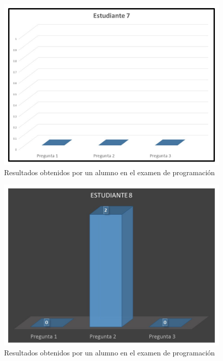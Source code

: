 \documentclass[12pt] {report}
\begin{document}
\begin{figure}[H]
\centering 
\includegraphics[scale=.4]{PEstudiante7.JPG}
\caption{Resultados obtenidos por un alumno en el examen de programación}
\end{figure}

\begin{figure}[H]
\centering 
\includegraphics[scale=.4]{PEstudiante8.JPG}
\caption{Resultados obtenidos por un alumno en el examen de programación}
\end{figure}
\end{document}
